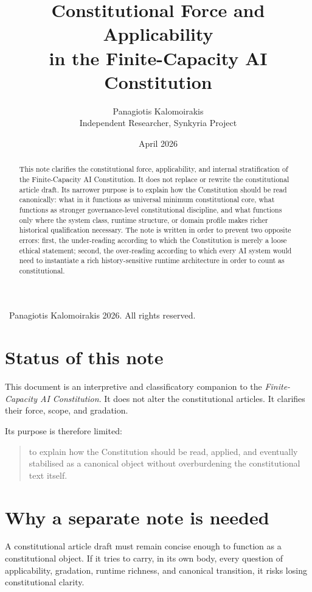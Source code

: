 \documentclass[11pt]{article}
\title{Constitutional Force and Applicability\\
in the Finite-Capacity AI Constitution}
\author{Panagiotis Kalomoirakis\\
Independent Researcher, Synkyria Project}
\date{April 2026}
\begin{document}
\maketitle

\begin{center}
\small \textcopyright\ Panagiotis Kalomoirakis 2026. All rights reserved.
\end{center}

\begin{abstract}
This note clarifies the constitutional force, applicability, and internal stratification of the Finite-Capacity AI Constitution. It does not replace or rewrite the constitutional article draft. Its narrower purpose is to explain how the Constitution should be read canonically: what in it functions as universal minimum constitutional core, what functions as stronger governance-level constitutional discipline, and what functions only where the system class, runtime structure, or domain profile makes richer historical qualification necessary. The note is written in order to prevent two opposite errors: first, the under-reading according to which the Constitution is merely a loose ethical statement; second, the over-reading according to which every AI system would need to instantiate a rich history-sensitive runtime architecture in order to count as constitutional.
\end{abstract}

\section{Status of this note}

This document is an interpretive and classificatory companion to the \emph{Finite-Capacity AI Constitution}. It does not alter the constitutional articles. It clarifies their force, scope, and gradation.

Its purpose is therefore limited:
\begin{quote}
to explain how the Constitution should be read, applied, and eventually stabilised as a canonical object without overburdening the constitutional text itself.
\end{quote}

\section{Why a separate note is needed}

A constitutional article draft must remain concise enough to function as a constitutional object. If it tries to carry, in its own body, every question of applicability, gradation, runtime richness, and canonical transition, it risks losing constitutional clarity.
\end{document}
